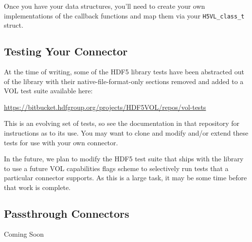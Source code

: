 Once you have your data structures, you'll need to create your own
implementations of the callback functions and map them via your
{\tt H5VL\_class\_t} struct. 
\subsection{Testing Your Connector}

At the time of writing, some of the HDF5 library tests have been abstracted
out of the library with their native-file-format-only sections removed and
added to a VOL test suite available here:

\quad \quad \url{https://bitbucket.hdfgroup.org/projects/HDF5VOL/repos/vol-tests}

This is an evolving set of tests, so see the documentation in that repository
for instructions as to its use. You may want to clone and modify and/or
extend these tests for use with your own connector.

In the future, we plan to modify the HDF5 test suite that ships with the
library to use a future VOL capabilities flags scheme to selectively run
tests that a particular connector supports. As this is a large task, it may be
some time before that work is complete.

\subsection{Passthrough Connectors}

Coming Soon


